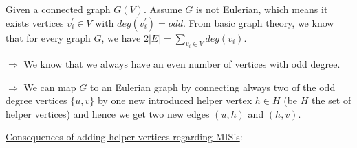 \documentclass{article}
\newtheorem*{theorem A}{Theorem A}
\newtheorem*{theorem B}{N\"olker's Theorem}
\theoremstyle{remark}
\theoremstyle{remark}
\begin{document}
\vspace{0.3cm}
Given a connected graph $G\left(V\right)$. Assume $G$ is \underline{not} Eulerian, which means it exists vertices $v_{i}^{\prime} \in V$ with $deg\left(v_{i}^{\prime}\right) = odd$. From basic graph theory, we know that for every graph $G$, we have $2|E| = \sum_{v_{i} \in V} deg\left(v_{i}\right)$.

\vspace{0.3cm}
$\Rightarrow$ We know that we always have an even number of vertices with odd degree.

\vspace{0.3cm}
$\Rightarrow$ We can map $G$ to an Eulerian graph by connecting always two of the odd degree vertices $\{ u, v \}$ by one new introduced helper vertex $h \in H$ (be $H$ the set of helper vertices) and hence we get two new edges $\left(u,h\right)$ and $\left(h,v\right)$.

\vspace{0.3cm}
\underline{Consequences of adding helper vertices regarding MIS's}:
\end{document}
